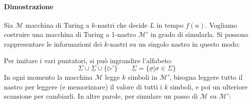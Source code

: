 \paragraph{Dimostrazione} Sia $\mathcal{M}$ macchina di Turing a $k$-nastri che decide $L$ in tempo $f(n)$. Vogliamo costruire una macchina di Turing a 1-nastro $\mathcal{M}'$ in grado di simularla. Si possono rappresentare le informazioni dei $k$-nastri su un singolo nastro in questo modo:
\begin{center}
\end{center}
Per imitare i vari puntatori, si può ingrandire l'alfabeto:
$$
    \Sigma \cup \underline{\Sigma} \cup \{\rhd'\}
    \qquad 
    \underline{\Sigma} = \{ \underline{\sigma}|\sigma\in\Sigma \}
$$
In ogni momento la macchina $\mathcal{M}$ legge $k$ simboli in $\mathcal{M}'$, bisogna leggere tutto il nastro per leggere (e memorizzare) il valore di tutti i $k$ simboli, e poi un ulteriore scansione per cambiarli. In altre parole, per simulare un passo di $\mathcal{M}$ su $\mathcal{M}'$:
